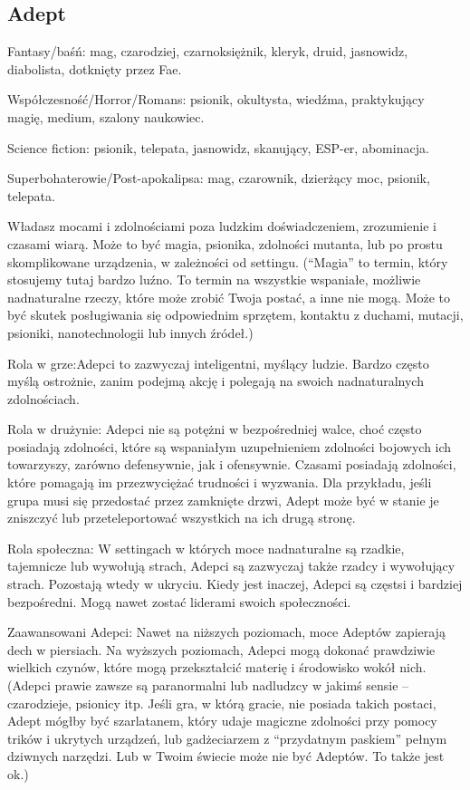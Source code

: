 \subsection{Adept}

Fantasy/baśń: mag, czarodziej, czarnoksiężnik, kleryk, druid, jasnowidz, diabolista, dotknięty przez Fae.

Współczesność/Horror/Romans: psionik, okultysta, wiedźma, praktykujący magię, medium, szalony naukowiec.

Science fiction: psionik, telepata, jasnowidz, skanujący, ESP-er, abominacja.

Superbohaterowie/Post-apokalipsa: mag, czarownik, dzierżący moc, psionik, telepata.

Władasz mocami i zdolnościami poza ludzkim doświadczeniem, zrozumienie i czasami wiarą. Może to być magia, psionika, zdolności mutanta, lub po prostu skomplikowane urządzenia, w zależności od settingu. (“Magia” to termin, który stosujemy tutaj bardzo luźno. To termin na wszystkie wspaniałe, możliwie nadnaturalne rzeczy, które może zrobić Twoja postać, a inne nie mogą. Może to być skutek posługiwania się odpowiednim sprzętem, kontaktu z duchami, mutacji, psioniki, nanotechnologii lub innych źródeł.)

Rola w grze:Adepci to zazwyczaj inteligentni, myślący ludzie. Bardzo często myślą ostrożnie, zanim podejmą akcję i polegają na swoich nadnaturalnych zdolnościach.

Rola w drużynie: Adepci nie są potężni w bezpośredniej walce, choć często posiadają zdolności, które są wspaniałym uzupełnieniem zdolności bojowych ich towarzyszy, zarówno defensywnie, jak i ofensywnie. Czasami posiadają zdolności, które pomagają im przezwyciężać trudności i wyzwania. Dla przykładu, jeśli grupa musi się przedostać przez zamknięte drzwi, Adept może być w stanie je zniszczyć lub przeteleportować wszystkich na ich drugą stronę.

Rola społeczna: W settingach w których moce nadnaturalne są rzadkie, tajemnicze lub wywołują strach, Adepci są zazwyczaj także rzadcy i wywołujący strach. Pozostają wtedy w ukryciu. Kiedy jest inaczej, Adepci są częstsi i bardziej bezpośredni. Mogą nawet zostać liderami swoich społeczności.

Zaawansowani Adepci: Nawet na niższych poziomach, moce Adeptów zapierają dech w piersiach. Na wyższych poziomach, Adepci mogą dokonać prawdziwie wielkich czynów, które mogą przekształcić materię i środowisko wokół nich.
(Adepci prawie zawsze są paranormalni lub nadludzcy w jakimś sensie – czarodzieje, psionicy itp. Jeśli gra, w którą gracie, nie posiada takich postaci, Adept mógłby być szarlatanem, który udaje magiczne zdolności przy pomocy trików i ukrytych urządzeń, lub gadżeciarzem z “przydatnym paskiem” pełnym dziwnych narzędzi. Lub w Twoim świecie może nie być Adeptów. To także jest ok.)

